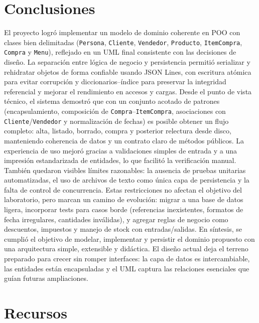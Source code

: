 \documentclass[11pt]{article}
\begin{document}
\section{Conclusiones} El proyecto logró implementar un modelo de dominio coherente en POO con clases bien delimitadas (\texttt{Persona}, \texttt{Cliente}, \texttt{Vendedor}, \texttt{Producto}, \texttt{ItemCompra}, \texttt{Compra} y \texttt{Menu}), reflejado en un UML final consistente con las decisiones de diseño. La separación entre lógica de negocio y persistencia permitió serializar y rehidratar objetos de forma confiable usando JSON Lines, con escritura atómica para evitar corrupción y diccionarios–índice para preservar la integridad referencial y mejorar el rendimiento en accesos y cargas. Desde el punto de vista técnico, el sistema demostró que con un conjunto acotado de patrones (encapsulamiento, composición de \texttt{Compra}–\texttt{ItemCompra}, asociaciones con \texttt{Cliente}/\texttt{Vendedor} y normalización de fechas) es posible obtener un flujo completo: alta, listado, borrado, compra y posterior relectura desde disco, manteniendo coherencia de datos y un contrato claro de métodos públicos. La experiencia de uso mejoró gracias a validaciones simples de entrada y a una impresión estandarizada de entidades, lo que facilitó la verificación manual. También quedaron visibles límites razonables: la ausencia de pruebas unitarias automatizadas, el uso de archivos de texto como única capa de persistencia y la falta de control de concurrencia. Estas restricciones no afectan el objetivo del laboratorio, pero marcan un camino de evolución: migrar a una base de datos ligera, incorporar tests para casos borde (referencias inexistentes, formatos de fecha irregulares, cantidades inválidas), y agregar reglas de negocio como descuentos, impuestos y manejo de stock con entradas/salidas. En síntesis, se cumplió el objetivo de modelar, implementar y persistir el dominio propuesto con una arquitectura simple, extensible y didáctica. El diseño actual deja el terreno preparado para crecer sin romper interfaces: la capa de datos es intercambiable, las entidades están encapsuladas y el UML captura las relaciones esenciales que guían futuras ampliaciones.

\newpage


\nocite{*}



\newpage

\appendix

\section{Recursos}
\end{document}
